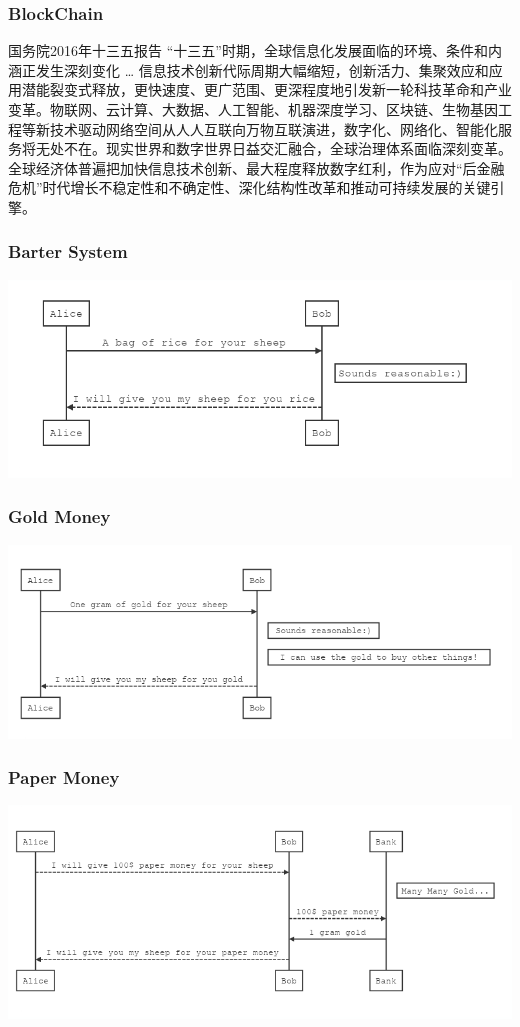 \begin{frame}
    \frametitle{BlockChain}
    \begin{block}{国务院2016年十三五报告}
        “十三五”时期，全球信息化发展面临的环境、条件和内涵正发生深刻变化 \ldots
        信息技术创新代际周期大幅缩短，创新活力、集聚效应和应用潜能裂变式释放，更快速度、更广范围、更深程度地引发新一轮科技革命和产业变革。物联网、云计算、大数据、人工智能、机器深度学习、\alert{区块链}、生物基因工程等新技术驱动网络空间从人人互联向万物互联演进，数字化、网络化、智能化服务将无处不在。现实世界和数字世界日益交汇融合，全球治理体系面临深刻变革。全球经济体普遍把加快信息技术创新、最大程度释放数字红利，作为应对“后金融危机”时代增长不稳定性和不确定性、深化结构性改革和推动可持续发展的关键引擎。
    \end{block}
\end{frame}

\begin{frame}
    \frametitle{Barter System}
    \includegraphics[scale=0.4]{./figures/barter-system.png}
\end{frame}

\begin{frame}
    \frametitle{Gold Money}
    \includegraphics[scale=0.4]{./figures/gold-money.png}
\end{frame}

\begin{frame}
    \frametitle{Paper Money}
    \includegraphics[scale=0.4]{./figures/paper-money.png}
\end{frame}

